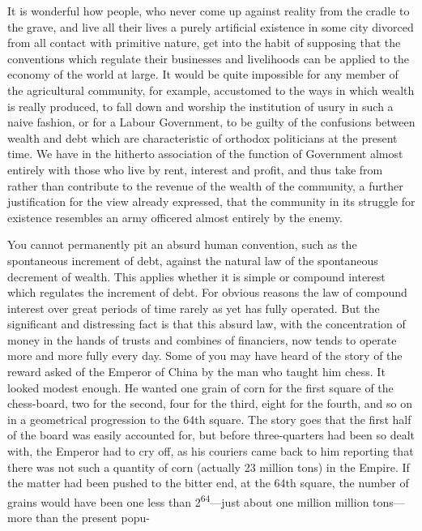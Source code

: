 \documentclass[10.5pt,twoside]{book}
\newcommand{\origpage}[1]{\clearpage\setcounter{page}{#1}}
\begin{document}
\origpage{30}

It is wonderful how people, who never come up against reality from the cradle
to the grave, and live all their lives a purely artificial existence in some
city divorced from all contact with primitive nature, get into the habit of
supposing that the conventions which regulate their businesses and livelihoods
can be applied to the economy of the world at large. It would be quite
impossible for any member of the agricultural community, for example,
accustomed to the ways in which wealth is really produced, to fall down and
worship the institution of usury in such a naive fashion, or for a Labour
Government, to be guilty of the confusions between wealth and debt which are
characteristic of orthodox politicians at the present time. We have in the
hitherto association of the function of Government almost entirely with those
who live by rent, interest and profit, and thus take from rather than
contribute to the revenue of the wealth of the community, a further
justification for the view already expressed, that the community in its
struggle for existence resembles an army officered almost entirely by the
enemy.

You cannot permanently pit an absurd human convention, such as the spontaneous
increment of debt, against the natural law of the spontaneous decrement of
wealth. This applies whether it is simple or compound interest which regulates
the increment of debt. For obvious reasons the law of compound interest over
great periods of time rarely as yet has fully operated. But the significant
and distressing fact is that this absurd law, with the concentration of money
in the hands of trusts and combines of financiers, now tends to operate more
and more fully every day. Some of you may have heard of the story of the
reward asked of the Emperor of China by the man who taught him chess. It
looked modest enough. He wanted one grain of corn for the first square of the
chess-board, two for the second, four for the third, eight for the fourth, and
so on in a geometrical progression to the 64th square. The story goes that the
first half of the board was easily accounted for, but before three-quarters
had been so dealt with, the Emperor had to cry off, as his couriers came back
to him reporting that there was not such a quantity of corn (actually 23
million tons) in the Empire. If the matter had been pushed to the bitter end,
at the 64th square, the number of grains would have been one less than
2\textsuperscript{64}---just about one million million tons---more than the
present popu-
\end{document}
